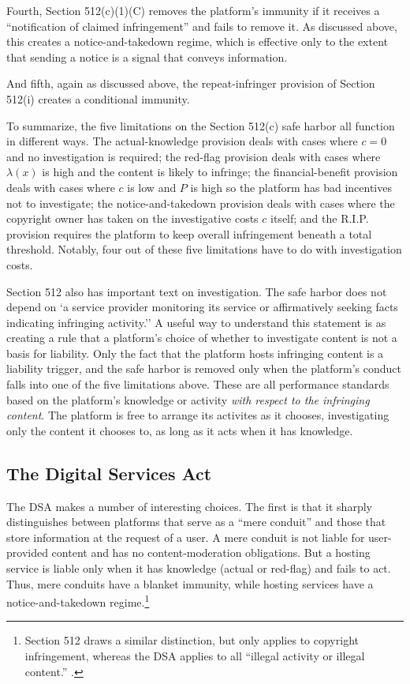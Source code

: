 Fourth, Section 512(c)(1)(C) removes the platform's immunity if it receives a ``notification of claimed infringement'' and fails to remove it.
 As discussed above, this creates a notice-and-takedown regime, which is effective only to the extent that sending a notice is a signal that conveys information.

And fifth, again as discussed above, the repeat-infringer provision of Section 512(i) creates a conditional immunity.

To summarize, the five limitations on the Section 512(c) safe harbor all function in different ways. The actual-knowledge provision deals with cases where $c = 0$ and no investigation is required; the red-flag provision deals with cases where $\lambda(x)$ is high and the content is likely to infringe; the financial-benefit provision deals with cases where $c$ is low and $P$ is high so the platform has bad incentives not to investigate; the notice-and-takedown provision deals with cases where the copyright owner has taken on the investigative costs $c$ itself; and the R.I.P. provision requires the platform to keep overall infringement beneath a total threshold. Notably, four out of these five limitations have to do with investigation costs.

Section 512 also has important text on investigation. The safe harbor does not depend on `a service provider monitoring its service or affirmatively seeking facts indicating infringing activity.'' A useful way to understand this statement is as creating a rule that a platform's choice of whether to investigate content is not a basis for liability. Only the fact that the platform hosts infringing content is a liability trigger, and the safe harbor is removed only when the platform's conduct falls into  one of the five limitations above. These are all performance standards based on the platform's knowledge or activity \emph{with respect to the infringing content}. The platform is free to arrange its activites as it chooses, investigating only the content it chooses to, as long as it acts when it has knowledge.

\subsection{The Digital Services Act}

The DSA makes a number of interesting choices. The first is that it sharply distinguishes between platforms that serve as a ``mere conduit'' and those that store information at the request of a user. A mere conduit is not liable for user-provided content and has no content-moderation obligations. But a hosting service is liable only when it has knowledge (actual or red-flag) and fails to act. Thus, mere conduits have a blanket immunity, while hosting services have a notice-and-takedown regime.\footnote{Section 512 draws a similar distinction, but only applies to copyright infringement, whereas the DSA applies to all ``illegal activity or illegal content.'' .}

